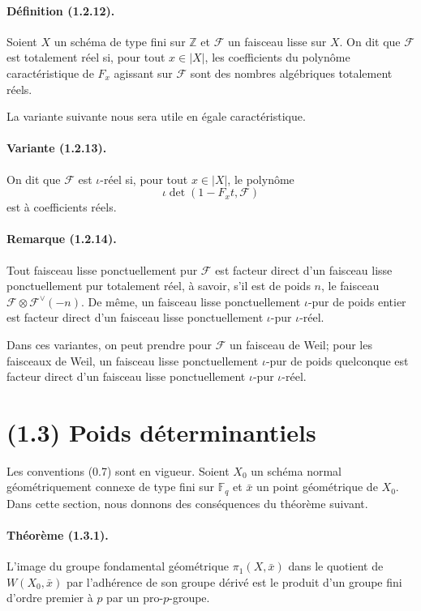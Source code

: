 \documentclass[11pt]{article}
\theoremstyle{remark}
\newcommand{\ZZ}{\mathbb{Z}}
\newcommand{\Fq}{\mathbb{F}_q}
\begin{document}
\paragraph{Définition (1.2.12).} Soient $X$ un schéma de type fini sur $\ZZ$ et $\mathcal F$ un faisceau lisse sur $X$. On dit que $\mathcal F$ est totalement réel si, pour tout $x\in |X|$, les coefficients du polynôme caractéristique de $F_x$ agissant sur $\mathcal F$ sont des nombres algébriques totalement réels.

La variante suivante nous sera utile en égale caractéristique.

\paragraph{Variante (1.2.13).} On dit que $\mathcal F$ est $\iota$-réel si, pour tout $x\in |X|$, le polynôme
\[
\iota\det(1-F_x t,\mathcal F)
\]
est à coefficients réels.

\paragraph{Remarque (1.2.14).} Tout faisceau lisse ponctuellement pur $\mathcal F$ est facteur direct d'un faisceau lisse ponctuellement pur totalement réel, à savoir, s'il est de poids $n$, le faisceau $\mathcal F\otimes\mathcal F^\vee(-n)$. De même, un faisceau lisse ponctuellement $\iota$-pur de poids entier est facteur direct d'un faisceau lisse ponctuellement $\iota$-pur $\iota$-réel.

Dans ces variantes, on peut prendre pour $\mathcal F$ un faisceau de Weil; pour les faisceaux de Weil, un faisceau lisse ponctuellement $\iota$-pur de poids quelconque est facteur direct d'un faisceau lisse ponctuellement $\iota$-pur $\iota$-réel.

\section*{(1.3) Poids déterminantiels}

Les conventions (0.7) sont en vigueur. Soient $X_0$ un schéma normal géométriquement connexe de type fini sur $\Fq$ et $\bar x$ un point géométrique de $X_0$. Dans cette section, nous donnons des conséquences du théorème suivant.

\paragraph{Théorème (1.3.1).} L'image du groupe fondamental géométrique $\pi_1(X,\bar x)$ dans le quotient de $W(X_0,\bar x)$ par l'adhérence de son groupe dérivé est le produit d'un groupe fini d'ordre premier à $p$ par un pro-$p$-groupe.
\end{document}

